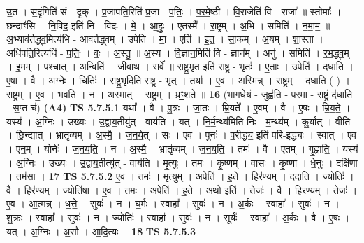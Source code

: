 \documentclass[17pt]{extarticle}
\begin{document}
                  उ॒त । स॒दृंगिति॑ सं - दृक् । प्र॒जाप॑ति॒रिति॑ प्र॒जा - प॒तिः॒ । प॒र॒मे॒ष्ठी । वि॒राजेति॑ वि - राजा᳚ ॥ स्तोमाः᳚ । छन्दाꣳ॑सि । नि॒विद॒ इति॑ नि - विदः॑ । मे॒ । आ॒हुः॒ । ए॒तस्मै᳚ । रा॒ष्ट्रम् । अ॒भि । समिति॑ । न॒मा॒म॒ ॥ अ॒भ्याव॑र्तद्ध्व॒मित्य॑भि - आव॑र्तद्ध्वम् । उपेति॑ । मा॒ । एति॑ । इ॒त॒ । सा॒कम् । अ॒यम् । शा॒स्ता । अधि॑पति॒रित्यधि॑ - प॒तिः॒ । वः॒ । अ॒स्तु॒ ॥ अ॒स्य । वि॒ज्ञान॒मिति॑ वि - ज्ञान᳚म् । अनु॑ । समिति॑ । र॒भ॒द्ध्व॒म् । इ॒मम् । प॒श्चात् । अन्विति॑ । जी॒वा॒थ॒ । सर्वे᳚ ॥ रा॒ष्ट्र॒भृत॒ इति॑ राष्ट्र - भृतः॑ । ए॒ताः । उपेति॑ । द॒धा॒ति॒ । ए॒षा । वै । अ॒ग्नेः । चितिः॑ । रा॒ष्ट्र॒भृदिति॑ राष्ट्र - भृत् । तया᳚ । ए॒व । अ॒स्मि॒न्न् । रा॒ष्ट्रम् । द॒धा॒ति॒ ( ) । रा॒ष्ट्रम् । ए॒व । भ॒व॒ति॒ । न । अ॒स्मा॒त् । रा॒ष्ट्रम् । भ्रꣳ॒॒श॒ते॒ ॥ \textbf{  16} \newline
                  \newline
                      (भा॒ग॒धेयं॒ - जुह्व॑ति - पर॒मा - रा॒ष्ट्रं द॑धाति - स॒प्त च॑)  \textbf{(A4)} \newline \newline
                                \textbf{ TS 5.7.5.1} \newline
                  यथा᳚ । वै । पु॒त्रः । जा॒तः । म्रि॒यते᳚ । ए॒वम् । वै । ए॒षः । म्रि॒य॒ते॒ । यस्य॑ । अ॒ग्निः । उख्यः॑ । उ॒द्वाय॒तीयु॑त् - वाय॑ति । यत् । नि॒र्म॒न्थ्य॑मिति॑ निः - म॒न्थ्य᳚म् । कु॒र्यात् । वीति॑ । छि॒न्द्या॒त् । भ्रातृ॑व्यम् । अ॒स्मै॒ । ज॒न॒ये॒त् । सः । ए॒व । पुनः॑ । प॒रीद्ध्य॒ इति॑ परि-इद्ध्यः॑ । स्वात् । ए॒व । ए॒न॒म् । योनेः᳚ । ज॒न॒य॒ति॒ । न । अ॒स्मै॒ । भ्रातृ॑व्यम् । ज॒न॒य॒ति॒ । तमः॑ । वै । ए॒तम् । गृ॒ह्णा॒ति॒ । यस्य॑ । अ॒ग्निः । उख्यः॑ । उ॒द्वाय॒तीत्यु॑त् - वाय॑ति । मृ॒त्युः । तमः॑ । कृ॒ष्णम् । वासः॑ । कृ॒ष्णा । धे॒नुः । दक्षि॑णा । तम॑सा । \textbf{  17} \newline
                  \newline
                                \textbf{ TS 5.7.5.2} \newline
                  ए॒व । तमः॑ । मृ॒त्युम् । अपेति॑ । ह॒ते॒ । हिर॑ण्यम् । द॒दा॒ति॒ । ज्योतिः॑ । वै । हिर॑ण्यम् । ज्योति॑षा । ए॒व । तमः॑ । अपेति॑ । ह॒ते॒ । अथो॒ इति॑ । तेजः॑ । वै । हिर॑ण्यम् । तेजः॑ । ए॒व । आ॒त्मन्न् । ध॒त्ते॒ । सुवः॑ । न । घ॒र्मः । स्वाहा᳚ । सुवः॑ । न । अ॒र्कः । स्वाहा᳚ । सुवः॑ । न । शु॒क्रः । स्वाहा᳚ । सुवः॑ । न । ज्योतिः॑ । स्वाहा᳚ । सुवः॑ । न । सूर्यः॑ । स्वाहा᳚ । अ॒र्कः । वै । ए॒षः । यत् । अ॒ग्निः । अ॒सौ । आ॒दि॒त्यः । \textbf{  18} \newline
                  \newline
                                \textbf{ TS 5.7.5.3} \newline
\end{document}
